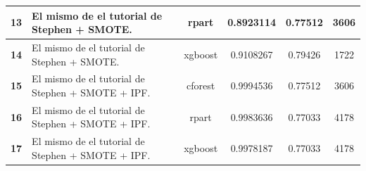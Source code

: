 \documentclass[10pt,a4paper]{article}
\begin{document}
\begin{landscape}
\begin{table}[H]
\begin{tabular}{|c|l|c|c|c|c|}
\multicolumn{1}{|l|}{\textbf{13}} & El mismo de el tutorial de Stephen + SMOTE.                                                                                                                                                                                                                                 & rpart                                  & 0.8923114                                                        & 0.77512                                                         & 3606             \\ \hline
\multicolumn{1}{|l|}{\textbf{14}} & El mismo de el tutorial de Stephen + SMOTE.                                                                                                                                                                                                                                 & xgboost                                & 0.9108267                                                        & 0.79426                                                         & 1722             \\ \hline
\multicolumn{1}{|l|}{\textbf{15}} & El mismo de el tutorial de Stephen + SMOTE + IPF.                                                                                                                                                                                                                           & cforest                                & 0.9994536                                                        & 0.77512                                                         & 3606             \\ \hline
\multicolumn{1}{|l|}{\textbf{16}} & El mismo de el tutorial de Stephen + SMOTE + IPF.                                                                                                                                                                                                                           & rpart                                  & 0.9983636                                                        & 0.77033                                                         & 4178             \\ \hline
\multicolumn{1}{|l|}{\textbf{17}} & El mismo de el tutorial de Stephen + SMOTE + IPF.                                                                                                                                                                                                                           & xgboost                                & 0.9978187                                                        & 0.77033                                                         & 4178             \\ \hline
\end{tabular}
\end{table}
\end{landscape}
\end{document}
